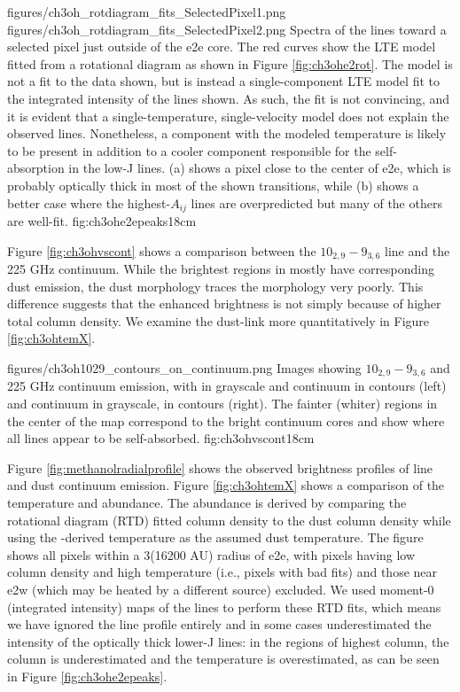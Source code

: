 \documentclass{aa}
\begin{document}
\FigureTwo
{figures/ch3oh_rotdiagram_fits_SelectedPixel1.png}
{figures/ch3oh_rotdiagram_fits_SelectedPixel2.png}
{Spectra of the \methanol lines toward a selected pixel just outside of the e2e
core.  The red curves show the LTE model fitted from a rotational diagram as
shown in Figure \ref{fig:ch3ohe2rot}.  The model is not a fit to the data
shown, but is instead a single-component LTE model fit to the integrated
intensity of the lines shown.  As such, the fit is not convincing, and it is
evident that a single-temperature, single-velocity model does not explain the
observed lines.  Nonetheless, a component with the modeled temperature is
likely to be present in addition to a cooler component responsible for the
self-absorption in the low-J lines.  (a) shows a pixel close to the center of
e2e, which is probably optically thick in most of the shown transitions, while
(b) shows a better case where the highest-$A_{ij}$ lines are overpredicted but
many of the others are well-fit.}
{fig:ch3ohe2epeaks}{1}{8cm}

Figure \ref{fig:ch3ohvscont} shows a comparison between the \methanol
$10_{2,9}-9_{3,6}$ line and the 225 GHz continuum.  While the brightest regions
in \methanol mostly have corresponding dust emission, the dust morphology
traces the \methanol morphology very poorly.  This difference suggests that the
enhanced brightness is not simply because of higher total column density.
We examine the dust-\methanol link more quantitatively in Figure
\ref{fig:ch3ohtemX}.

          {figures/ch3oh1029_contours_on_continuum.png}
{Images showing \methanol $10_{2,9}-9_{3,6}$ and 225 GHz continuum emission,
with \methanol in grayscale and continuum in contours (left) and continuum in
grayscale, \methanol in contours (right).  The fainter (whiter) regions in the center
of the \methanol map correspond to the bright continuum cores and show where all lines
appear to be self-absorbed.}
{fig:ch3ohvscont}{1}{8cm}

Figure \ref{fig:methanolradialprofile} shows the observed brightness profiles
of \methanol line and dust continuum emission.
Figure \ref{fig:ch3ohtemX} shows a comparison of the \methanol temperature and
abundance.  The \methanol abundance is derived by comparing the rotational
diagram (RTD) fitted \methanol column density to the dust column density while
using the \methanol-derived temperature as the assumed dust temperature.  The
figure shows all pixels within a 3\arcsec (16200 AU) radius of e2e, with pixels
having low column density and high temperature (i.e., pixels with bad fits) and
those near e2w (which may be heated by a different source) excluded.  We used
moment-0 (integrated intensity) maps of the \methanol lines to perform these
RTD fits, which means we have ignored the line profile entirely and in some
cases underestimated the intensity of the optically thick lower-J lines: in the
regions of highest column, the column is  underestimated and the temperature is
overestimated, as can be seen in Figure \ref{fig:ch3ohe2epeaks}.
\end{document}
